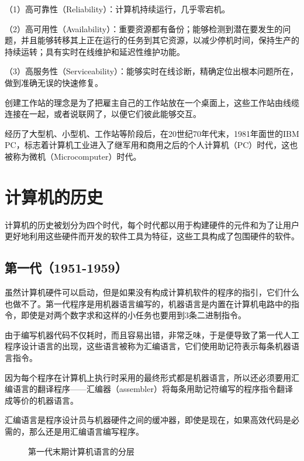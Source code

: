 （1）高可靠性（Reliability）：计算机持续运行，几乎零宕机。

（2）高可用性（Availability）：重要资源都有备份；能够检测到潜在要发生的问题，并且能够转移其上正在运行的任务到其它资源，以减少停机时间，保持生产的持续运转；具有实时在线维护和延迟性维护功能。

（3）高服务性（Serviceability）：能够实时在线诊断，精确定位出根本问题所在，做到准确无误的快速修复。

创建工作站的理念是为了把雇主自己的工作站放在一个桌面上，这些工作站由线缆连接在一起，或者说联网了，以便它们彼此能够交互。

经历了大型机、小型机、工作站等阶段后，在20世纪70年代末，1981年面世的IBM PC，标志着计算机工业进入了继军用和商用之后的个人计算机（PC）时代，这也被称为微机（Microcomputer）时代。

\chapter{计算机的历史}

计算机的历史被划分为四个时代，每个时代都以用于构建硬件的元件和为了让用户更好地利用这些硬件而开发的软件工具为特征，这些工具构成了包围硬件的软件。

\section{第一代（1951-1959）}

虽然计算机硬件可以启动，但是如果没有构成计算机软件的程序的指引，它们什么也做不了。第一代程序是用机器语言编写的，机器语言是内置在计算机电路中的指令，即使是对两个数字求和这样的小任务也要用到3条二进制指令。

由于编写机器代码不仅耗时，而且容易出错，非常乏味，于是便导致了第一代人工程序设计语言的出现，这些语言被称为汇编语言，它们使用助记符表示每条机器语言指令。

因为每个程序在计算机上执行时采用的最终形式都是机器语言，所以还必须要用汇编语言的翻译程序——汇编器（assembler）将每条用助记符编写的程序指令翻译成等价的机器语言。

汇编语言是程序设计员与机器硬件之间的缓冲器，即使是现在，如果高效代码是必需的，那么还是用汇编语言编写程序。

\begin{figure}[!h]
\centering
\caption{第一代末期计算机语言的分层}
\end{figure}

